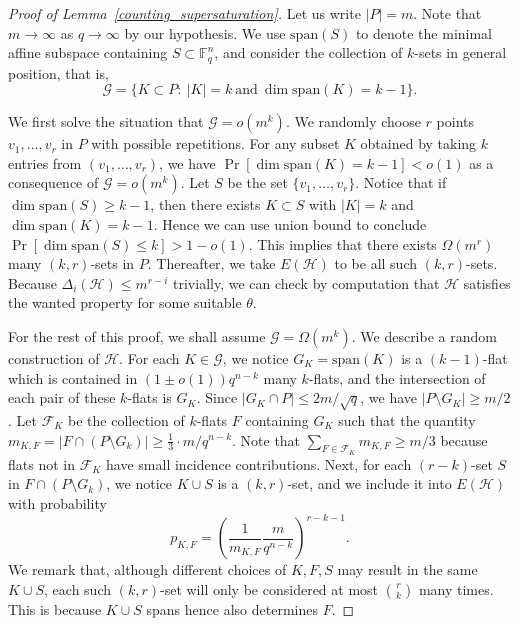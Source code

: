 \documentclass[11pt]{article}
\theoremstyle{definition}
\begin{document}
\begin{proof}[Proof of Lemma~\ref{counting_supersaturation}]

    Let us write $|P| = m$. Note that $m \to \infty$ as $q \to \infty$ by our hypothesis. We use $\text{span}(S)$ to denote the minimal affine subspace containing $S \subset \mathbb{F}_q^n$, and consider the collection of $k$-sets in general position, that is, \begin{equation*}
        \mathcal{G} = \{K \subset P:~ |K| = k ~\text{and}~ \dim \text{span}(K) = k - 1\}.
    \end{equation*}

    We first solve the situation that $\mathcal{G} = o(m^k)$. We randomly choose $r$ points $v_1,\dots,v_r$ in $P$ with possible repetitions. For any subset $K$ obtained by taking $k$ entries from $(v_1,\dots,v_r)$, we have $\Pr[\dim \text{span}(K) = k - 1] < o(1)$ as a consequence of $\mathcal{G} = o(m^k)$. Let $S$ be the set $\{v_1,\dots,v_r\}$. Notice that if $\dim \text{span}(S) \geq k - 1$, then there exists $K \subset S$ with $|K| = k$ and $\dim \text{span}(K) = k - 1$. Hence we can use union bound to conclude  $\Pr[\dim \text{span}(S) \leq k] > 1 - o(1)$. This implies that there exists $\Omega(m^r)$ many $(k,r)$-sets in $P$. Thereafter, we take $E(\mathcal{H})$ to be all such $(k,r)$-sets. Because $\Delta_i(\mathcal{H}) \leq m^{r-i}$ trivially, we can check by computation that $\mathcal{H}$ satisfies the wanted property for some suitable $\theta$. %
    
    For the rest of this proof, we shall assume $\mathcal{G} = \Omega(m^k)$. We describe a random construction of $\mathcal{H}$. For each $K \in \mathcal{G}$, we notice $G_K = \text{span}(K)$ is a $(k-1)$-flat which is contained in $(1 \pm o(1)) q^{n-k}$ many $k$-flats, and the intersection of each pair of these $k$-flats is $G_K$. Since $|G_K \cap P| \leq 2m/\sqrt{q}$, we have $|P \setminus G_K| \geq m/2$. Let $\mathcal{F}_K$ be the collection of $k$-flats $F$ containing $G_K$ such that the quantity $m_{K,F} = |F \cap (P\setminus G_k)| \geq \frac{1}{3} \cdot m/q^{n-k}$. Note that $\sum_{F\in \mathcal{F}_K} m_{K,F} \geq m/3$ because flats not in $\mathcal{F}_K$ have small incidence contributions. Next, for each $(r-k)$-set $S$ in $F \cap (P\setminus G_k)$, we notice $K \cup S$ is a $(k,r)$-set, and we include it into $E(\mathcal{H})$ with probability\begin{equation*}
        p_{K,F} = \left( \frac{1}{m_{K,F}} \frac{m}{q^{n-k}} \right)^{r - k - 1}.
    \end{equation*} We remark that, although different choices of $K, F, S$ may result in the same $K \cup S$, each such $(k,r)$-set will only be considered at most $\binom{r}{k}$ many times. This is because $K \cup S$ spans hence also determines $F$.


\end{proof}
\end{document}
